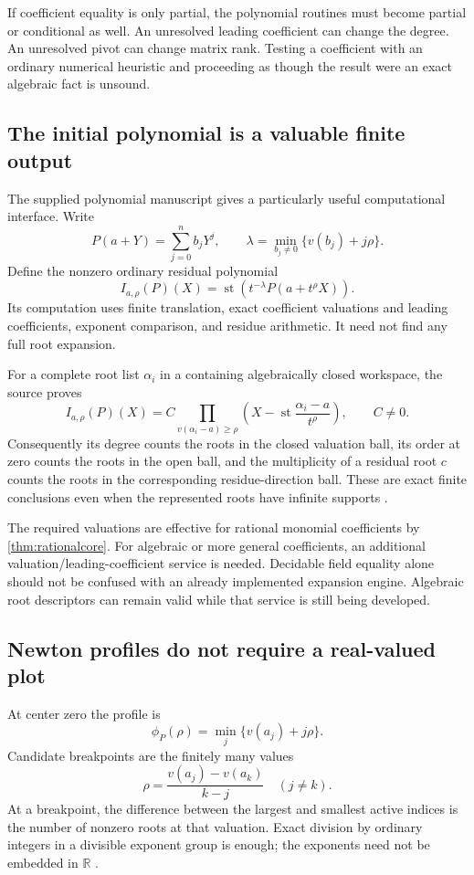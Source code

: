 \documentclass[11pt,letterpaper]{article}
\numberwithin{equation}{section}
\theoremstyle{definition}
\theoremstyle{remark}\newtheorem{remark}[theorem]{Remark}
\newcommand{\R}{\mathbb R}
\newcommand{\st}{\operatorname{st}}
\begin{document}
If coefficient equality is only partial, the polynomial routines must become
partial or conditional as well. An unresolved leading coefficient can change
the degree. An unresolved pivot can change matrix rank. Testing a coefficient
with an ordinary numerical heuristic and proceeding as though the result were
an exact algebraic fact is unsound.

\subsection{The initial polynomial is a valuable finite output}
The supplied polynomial manuscript gives a particularly useful computational
interface. Write
\[
 P(a+Y)=\sum_{j=0}^n b_jY^j,\qquad
 \lambda=\min_{b_j\ne0}\{v(b_j)+j\rho\}.
\]
Define the nonzero ordinary residual polynomial
\begin{equation}\label{eq:initial}
 I_{a,\rho}(P)(X)=\st\!\left(t^{-\lambda}P(a+t^\rho X)\right).
\end{equation}
Its computation uses finite translation, exact coefficient valuations and
leading coefficients, exponent comparison, and residue arithmetic. It need
not find any full root expansion.

For a complete root list $\alpha_i$ in a containing algebraically closed
workspace, the source proves
\begin{equation}\label{eq:initialfactor}
 I_{a,\rho}(P)(X)=C
 \prod_{v(\alpha_i-a)\ge\rho}
 \left(X-\st\frac{\alpha_i-a}{t^\rho}\right),\qquad C\ne0.
\end{equation}
Consequently its degree counts the roots in the closed valuation ball,
its order at zero counts the roots in the open ball, and the multiplicity
of a residual root $c$ counts the roots in the corresponding residue-direction
ball. These are exact finite conclusions even when the represented roots
have infinite supports \cite{SourcePolynomial}.

The required valuations are effective for rational monomial coefficients by
\cref{thm:rationalcore}. For algebraic or more general coefficients, an
additional valuation/leading-coefficient service is needed. Decidable field
equality alone should not be confused with an already implemented expansion
engine. Algebraic root descriptors can remain valid while that service is
still being developed.

\subsection{Newton profiles do not require a real-valued plot}
At center zero the profile is
\[
 \phi_P(\rho)=\min_j\{v(a_j)+j\rho\}.
\]
Candidate breakpoints are the finitely many values
\[
 \rho=\frac{v(a_j)-v(a_k)}{k-j}\quad(j\ne k).
\]
At a breakpoint, the difference between the largest and smallest active
indices is the number of nonzero roots at that valuation. Exact division by
ordinary integers in a divisible exponent group is enough; the exponents
need not be embedded in $\R$ \cite{SourcePolynomial}.
\end{document}

